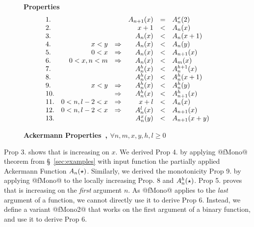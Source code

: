\begin{figure}[t!]
\textbf{Properties}
$$
\begin{array}{lrcrcl}
1.&                &&            A_{n+1}(x)   &=& A^{x}_{n}(2)\\
2.&                &&            x + 1          &<& A_{n}(x)\\
3.&                &&            A_{n}(x)     &<& A_{n}(x+1)\\
4.& x < y          &\Rightarrow& A_{n}(x)     &<& A_{n}(y)\\
5.& 0 < x          &\Rightarrow& A_{n}(x)     &<& A_{n+1}(x)\\
6.& 0 < x, n < m   &\Rightarrow& A_{n}(x)     &<& A_{m}(x)\\
7.&                &&            A^{h}_{n}(x) &<& A^{h+1}_{n}(x)\\
8.&                &&            A^{h}_{n}(x) &<& A^{h}_{n}(x+1)\\
9.& x<y            &\Rightarrow& A^{h}_{n}(x) &<& A^{h}_{n}(y)\\
10.&               &\Rightarrow& A^{h}_{n}(x) &<& A^{h}_{n+1}(x)\\
11.& 0<n, l-2 < x  &\Rightarrow& x + l          &<& A_{n}(x)\\
12.& 0<n, l-2 < x  &\Rightarrow& A^{l}_{n}(x) &<& A_{n+1}(x)\\
13.&               &&            A^{x}_{n}(y) &<& A_{n+1}(x+y)\\
\end{array}
$$
\caption{\textbf{Ackermann Properties~\citep{ackermann},
$\forall n, m, x, y, h, l \geq 0$}}
\label{fig:ackermann}
\end{figure}

%
Prop 3. shows that  is increasing on $x$.
%
We derived Prop 4. by applying @fMono@ theorem
from \S~\ref{sec:examples} with input function
the partially applied Ackermann Function
$A_{n}(\star)$.
%
Similarly, we derived the monotonicity Prop 9. by
applying @fMono@ to the locally increasing Prop. 8
and $A^{h}_{n}(\star)$.
%
Prop 5. proves that  is increasing
on the \emph{first} argument $n$.
%
As @fMono@ applies to the \emph{last} argument
of a function, we cannot directly use it to
derive Prop 6.
%
Instead, we define a variant @fMono2@ that works
on the first argument of a binary function, and
use it to derive Prop 6.

